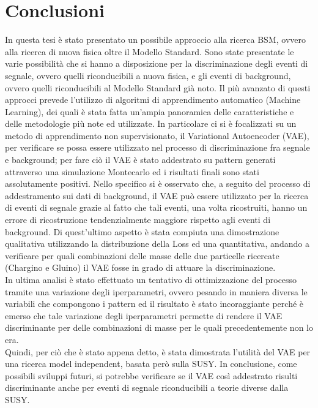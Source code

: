 
\section{Conclusioni}
\label{sec:conclusioni}

In questa tesi è stato presentato un possibile approccio alla ricerca BSM, ovvero alla ricerca di nuova fisica oltre il Modello Standard. Sono state presentate le varie possibilità che si hanno a disposizione per la discriminazione degli eventi di segnale, ovvero quelli riconducibili a nuova fisica, e gli eventi di background, ovvero quelli riconducibili al Modello Standard già noto. Il più avanzato di questi approcci prevede l'utilizzo di algoritmi di apprendimento automatico (Machine Learning), dei quali è stata fatta un'ampia panoramica delle caratteristiche e delle metodologie più note ed utilizzate. In particolare ci si è focalizzati su un metodo di apprendimento non supervisionato, il Variational Autoencoder (VAE), per verificare se possa essere utilizzato nel processo di discriminazione fra segnale e background; per fare ciò il VAE è stato addestrato su pattern generati attraverso una simulazione Montecarlo ed i risultati finali sono stati assolutamente positivi. Nello specifico si è osservato che, a seguito del processo di addestramento sui dati di background, il VAE può essere utilizzato per la ricerca di eventi di segnale grazie al fatto che tali eventi, una volta ricostruiti, hanno un errore di ricostruzione tendenzialmente maggiore rispetto agli eventi di background. Di quest'ultimo aspetto è stata compiuta una dimostrazione qualitativa utilizzando la distribuzione della Loss ed una quantitativa, andando a verificare per quali combinazioni delle masse delle due particelle ricercate (Chargino e Gluino) il VAE fosse in grado di attuare la discriminazione.\\
In ultima analisi è stato effettuato un tentativo di ottimizzazione del processo tramite una variazione degli iperparametri, ovvero pesando in maniera diversa le variabili che compongono i pattern ed il risultato è stato incoraggiante perché è emerso che tale variazione degli iperparametri permette di rendere il VAE discriminante per delle combinazioni di masse per le quali precedentemente non lo era.\\
Quindi, per ciò che è stato appena detto, è stata dimostrata l'utilità del VAE per una ricerca model independent, basata però sulla SUSY. In conclusione, come possibili sviluppi futuri, si potrebbe verificare se il VAE così addestrato risulti discriminante anche per eventi di segnale riconducibili a teorie diverse dalla SUSY.